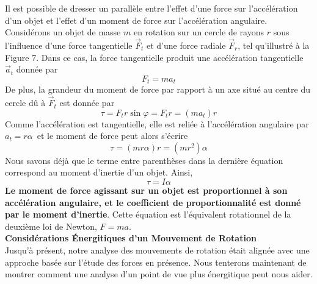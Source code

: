 \documentclass[titlepage,oneside,a4paper,11pt]{book} %
\begin{document}
Il est possible de dresser un parallèle entre l'effet d'une force sur l'accélération d'un objet et l'effet d'un moment de force sur l'accélération angulaire. Considérons un objet de masse $m$ en rotation sur un cercle de rayons $r$ sous l'influence d'une force tangentielle $\vec{F}_t$ et d'une force radiale $\vec{F}_r$, tel qu'illustré à la Figure 7. Dans ce cas, la force tangentielle produit une accélération tangentielle $\vec{a}_t$ donnée par
\begin{equation*}
F_t = ma_t
\end{equation*}
De plus, la grandeur du moment de force par rapport à un axe situé au centre du cercle dû à $\vec{F}_t$ est donnée par
\begin{equation*}
\tau = F_tr\sin\varphi = F_tr=(ma_t)r
\end{equation*}
Comme l'accélération est tangentielle, elle est reliée à l'accélération angulaire par $a_t=r\alpha$ et le moment de force peut alors s'écrire
\begin{equation*}
\tau =(mr\alpha)r = (mr^2)\alpha
\end{equation*}
Nous savons déjà que le terme entre parenthèses dans la dernière équation correspond au moment d'inertie d'un objet. Ainsi,
\begin{equation}
\tau = I\alpha
\end{equation}
\textbf{Le moment de force agissant sur un objet est proportionnel à son accélération angulaire, et le coefficient de proportionnalité est donné par le moment d'inertie}. Cette équation est l'équivalent rotationnel de la deuxième loi de Newton, $F=ma$.\\
\newpage
{\large \textbf{Considérations Énergitiques d'un Mouvement de Rotation}}\\

Jusqu'à présent, notre analyse des mouvements de rotation était alignée avec une approche basée sur l'étude des forces en présence. Nous tenterons maintenant de montrer comment une analyse d'un point de vue plus énergitique peut nous aider.
\end{document}
